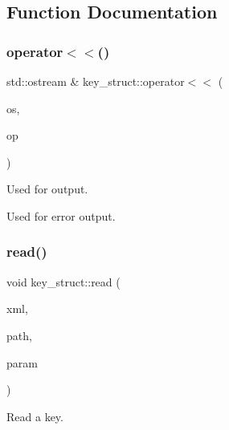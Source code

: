 \subsection{Function Documentation}
\mbox{\label{namespacekey__struct_a3ba183723f87a3b999656e0e300430ed}} 
\subsubsection{\texorpdfstring{operator$<$$<$()}{operator<<()}}
{\footnotesize\ttfamily std\+::ostream \& key\+\_\+struct\+::operator$<$$<$ (\begin{DoxyParamCaption}\item[{std\+::ostream \&}]{os,  }\item[{const \mbox{\hyperlink{structkey__struct_1_1KeyHadronSUNNPartNPtIrrep__t}{Key\+Hadron\+S\+U\+N\+N\+Part\+N\+Pt\+Irrep\+\_\+t}} \&}]{op }\end{DoxyParamCaption})}



Used for output. 

Used for error output. \mbox{\label{namespacekey__struct_a7ee02ccf72111091675d9639205389d0}} 
\subsubsection{\texorpdfstring{read()}{read()}\hspace{0.1cm}{\footnotesize\ttfamily [1/2]}}
{\footnotesize\ttfamily void key\+\_\+struct\+::read (\begin{DoxyParamCaption}\item[{X\+M\+L\+Reader \&}]{xml,  }\item[{const std\+::string \&}]{path,  }\item[{\mbox{\hyperlink{structkey__struct_1_1KeyHadronSUNNPartNPtIrrep__t}{Key\+Hadron\+S\+U\+N\+N\+Part\+N\+Pt\+Irrep\+\_\+t}} \&}]{param }\end{DoxyParamCaption})}



Read a key. 

